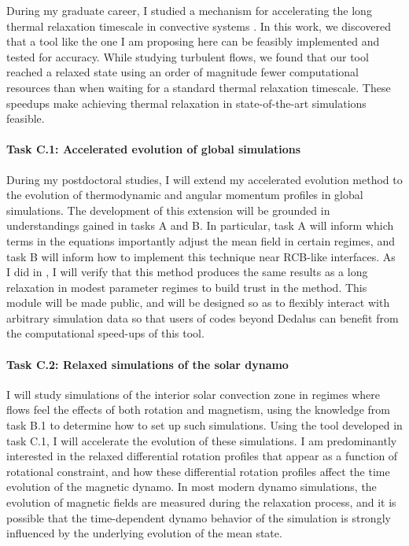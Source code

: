 \documentclass[11pt, preprint]{aastex}
\begin{document}
During my graduate career, I studied a mechanism for accelerating the long thermal relaxation timescale in convective systems \citep{anders&all2018}.
In this work, we discovered that a tool like the one I am proposing here can be feasibly implemented and tested for accuracy.
While studying turbulent flows, we found that our tool reached a relaxed state using an order of magnitude fewer computational resources than when waiting for a standard thermal relaxation timescale.
These speedups make achieving thermal relaxation in state-of-the-art simulations feasible.

\paragraph{Task C.1: Accelerated evolution of global simulations}
\label{sct:taskC1}
During my postdoctoral studies, I will extend my accelerated evolution method to the evolution of thermodynamic and angular momentum profiles in global simulations.
The development of this extension will be grounded in understandings gained in tasks A and B.
In particular, task A will inform which terms in the equations importantly adjust the mean field in certain regimes, and task B will inform how to implement this technique near RCB-like interfaces.
As I did in \citet{anders&all2018}, I will verify that this method produces the same results as a long relaxation in modest parameter regimes to build trust in the method.
This module will be made public, and will be designed so as to flexibly interact with arbitrary simulation data so that users of codes beyond Dedalus can benefit from the computational speed-ups of this tool.

\paragraph{Task C.2: Relaxed simulations of the solar dynamo}
\label{sct:taskC2}
I will study simulations of the interior solar convection zone in regimes where flows feel the effects of both rotation and magnetism, using the knowledge from task B.1 to determine how to set up such simulations.
Using the tool developed in task C.1, I will accelerate the evolution of these simulations.
I am predominantly interested in the relaxed differential rotation profiles that appear as a function of rotational constraint, and how these differential rotation profiles affect the time evolution of the magnetic dynamo.
In most modern dynamo simulations, the evolution of magnetic fields are measured during the relaxation process, and it is possible that the time-dependent dynamo behavior of the simulation is strongly influenced by the underlying evolution of the mean state.
\end{document}
